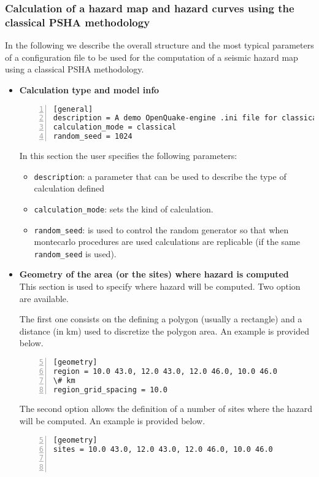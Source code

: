 \subsubsection{Calculation of a hazard map and hazard curves using 
    the classical PSHA methodology}
\label{sec:config_classical_PSHA}
%
In the following we describe the overall structure and the
most typical parameters of a configuration file to be used for the 
computation of a seismic hazard map using a classical PSHA methodology.
\begin{itemize}
\item \textbf{Calculation type and model info}
\begin{Verbatim}[frame=single, commandchars=\\\{\}, fontsize=\small,
    numbers=left, numbersep=2pt]
[general]
description = A demo OpenQuake-engine .ini file for classical PSHA
calculation_mode = classical
random_seed = 1024
\end{Verbatim}
In this section the user specifies the following parameters:
\begin{itemize}
    \item \texttt{description}: a parameter that can be used to describe 
        the type of calculation defined 
    \item \texttt{calculation\_mode}: sets the kind of calculation. 
    \item \texttt{random\_seed}: is used to control the random generator 
        so that when montecarlo procedures are used calculations are 
        replicable (if the same \texttt{random\_seed} is used).
\end{itemize}
%
\item \textbf{Geometry of the area (or the sites) where hazard is computed}
    \hfill \\
This section is used to specify where hazard will be computed. Two 
option are available. 

The first one consists on the defining a polygon 
(usually a rectangle) and a distance (in km) used to discretize the 
polygon area. An example is provided below.
\begin{Verbatim}[frame=single, commandchars=\\\{\}, fontsize=\small,
    firstnumber=5, numbers=left, numbersep=2pt]
[geometry]
region = 10.0 43.0, 12.0 43.0, 12.0 46.0, 10.0 46.0
\# km
region_grid_spacing = 10.0
\end{Verbatim}

The second option allows the definition of a number of sites where 
the hazard will be computed. An example is provided below.
\begin{Verbatim}[frame=single, commandchars=\\\{\}, fontsize=\small,
    firstnumber=5, numbers=left, numbersep=2pt]
[geometry]
sites = 10.0 43.0, 12.0 43.0, 12.0 46.0, 10.0 46.0



\end{Verbatim}
\end{itemize}
